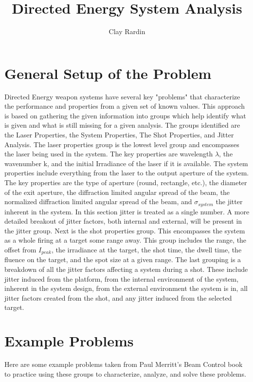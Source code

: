 \documentclass[]{article}
\title{Directed Energy System Analysis}
\author{Clay Rardin}
\begin{document}
\maketitle

\section{General Setup of the Problem}
Directed Energy weapon systems have several key "problems" that characterize the performance and properties from a given set of known values.  This approach is based on gathering the given information into groups which help identify what is given and what is still missing for a given analysis.  The groups identified are the Laser Properties, the System Properties, The Shot Properties, and Jitter Analysis.  The laser properties group is the lowest level group and encompasses the laser being used in the system.  The key properties are wavelength $\lambda$, the wavenumber k, and the initial Irradiance of the laser if it is available.  The system properties include everything from the laser to the output aperture of the system.  The key properties are the type of aperture (round, rectangle, etc.), the diameter of the exit aperture, the diffraction limited angular spread of the beam, the normalized diffraction limited angular spread of the beam, and $\sigma_{system}$ the jitter inherent in the system.  In this section jitter is treated as a single number.  A more detailed breakout of jitter factors, both internal and external, will be present in the jitter group.   Next is the shot properties group.  This encompasses the system as a whole firing at a target some range away.  This group includes the range, the offset from $I_{peak}$, the irradiance at the target, the shot time, the dwell time, the fluence on the target, and the spot size at a given range.  The last grouping is a breakdown of all the jitter factors affecting a system during a shot.  These include jitter induced from the platform, from the internal environment of the system, inherent in the system design, from the external environment the system is in, all jitter factors created from the shot, and any jitter induced from the selected target.

\section{Example Problems}
Here are some example problems taken from Paul Merritt's Beam Control book to practice using these groups to characterize, analyze, and solve these problems.
\end{document}
